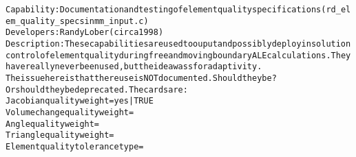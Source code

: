 \documentclass{article}
\begin{document}
\begin{alltt}
Capability: Documentation and testing of element quality specifications (rd_elem_quality_specs in mm_input.c)
Developers: Randy Lober (circa 1998)
Description: These capabilities are used to ouput and possibly deploy in solution control of element quality during free and moving boundary ALE calculations.  They have really never been used, but the idea wass for adaptivity.  
The issue here is that there use is NOT documented.    Should they be?  Or should they be deprecated.   The cards are:
Jacobian quality weight= yes | TRUE
Volume change quality weight=
Angle quality weight=
Triangle quality weight=
Element quality tolerance type=

\end{alltt}
\end{document}
